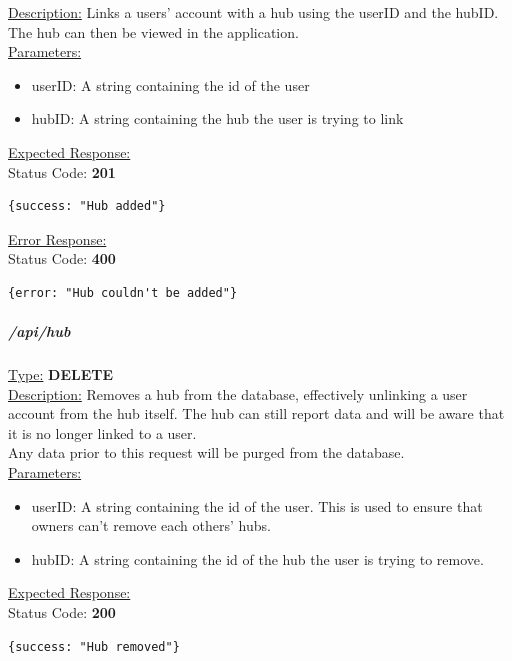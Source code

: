 \documentclass[draft,preprint,12pt,3p]{elsarticle}
\newcommand{\forceindent}{\leavevmode{\parindent=1em\indent}}
\begin{document}
\underline{Description:} Links a users' account with a hub using the userID and the hubID. The hub can then be viewed in the application.\\

\underline{Parameters:}
\begin{itemize}
\item userID: A string containing the id of the user

\item hubID: A string containing the hub the user is trying to link
\end{itemize}
\underline{Expected Response:}\\[5pt]
\forceindent Status Code: \textbf{201} \\
\begin{verbatim}
{success: "Hub added"}
\end{verbatim}

\underline{Error Response:}\\[5pt]
\forceindent Status Code: \textbf{400} \\
\begin{verbatim}
{error: "Hub couldn't be added"}
\end{verbatim}



\subparagraph*{/api/hub}
\underline{Type:} \textbf{DELETE}\\

\underline{Description:} Removes a hub from the database, effectively unlinking a user account from the hub itself. The hub can still report data and will be aware that it is no longer linked to a user.\\
Any data prior to this request will be purged from the database.\\

\underline{Parameters:}
\begin{itemize}
\item userID: A string containing the id of the user. This is used to ensure that owners can't remove each others' hubs.

\item hubID: A string containing the id of the hub the user is trying to remove.
\end{itemize}

\underline{Expected Response:}\\[5pt]
\forceindent Status Code: \textbf{200} \\
\begin{verbatim}
{success: "Hub removed"}
\end{verbatim}
\end{document}
